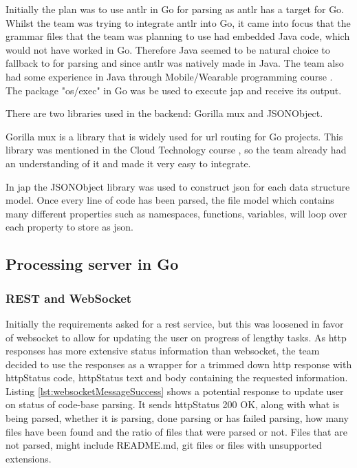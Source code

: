 Initially the plan was to use \gls{antlr} in Go for parsing as \gls{antlr} has a target for Go. Whilst the team was trying to integrate \gls{antlr} into Go, it came into focus that the grammar files that the team was planning to use had embedded Java code, which would not have worked in Go. Therefore Java seemed to be natural choice to fallback to for parsing and since \gls{antlr} was natively made in Java. The team also had some experience in Java through Mobile/Wearable programming course \cite{course:mobileWearable}. The package "os/exec" in Go was be used to execute \gls{jap} and receive its output.

There are two libraries used in the \gls{backend}: Gorilla mux and JSONObject.

Gorilla mux is a library that is widely used for \gls{url} routing for Go projects. This library was mentioned in the Cloud Technology course \cite{course:cloud}, so the team already had an understanding of it and made it very easy to integrate. 

In \gls{jap} the JSONObject library was used to construct \gls{json} for each data structure model. Once every line of code has been parsed, the file model which contains many different properties such as namespaces, functions, variables, will loop over each property to store as \gls{json}.
 



\subsection{Processing server in Go}    \label{subsection:Go}

\subsubsection{REST and WebSocket}

Initially the requirements asked for a \gls{rest} service, but this was loosened in favor of \gls{websocket} to allow for updating the user on progress of lengthy tasks. As \gls{http} responses has more extensive status information than \gls{websocket}, the team decided to use the responses as a wrapper for a trimmed down \gls{http} response with \gls{http}Status code, \gls{http}Status text and body containing the requested information. Listing \ref{lst:websocketMessageSuccess} shows a potential response to update user on status of code-base parsing. It sends \gls{http}Status 200 OK, along with what is being parsed, whether it is parsing, done parsing or has failed parsing, how many files have been found and the ratio of files that were parsed or not. Files that are not parsed, might include README.md, \gls{git} files or files with unsupported extensions.  

